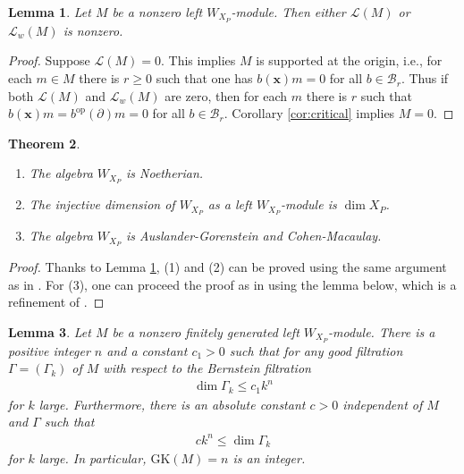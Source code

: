 \documentclass[11pt,a4paper,usenames,dvipsnames,reqno]{amsart}
\numberwithin{equation}{section}
\newtheorem{Thm}{Theorem}[section]
\newtheorem{Lem}[Thm]{Lemma}
\theoremstyle{definition}
\theoremstyle{remark}
\begin{document}
\begin{Lem}\label{lem:localization}
Let $M$ be a nonzero left $W_{X_P}$-module. Then either $\mathcal{L}(M)$ or $\mathcal{L}_w(M)$ is nonzero.
\end{Lem}

\begin{proof}
     Suppose $\mathcal{L}(M)=0$. This implies $M$ is supported at the origin, i.e., for each $m\in M$ there is $r\ge 0$ such that one has $b(\mathbf{x})m=0$ for all $b\in \mathcal{B}_r$. Thus if both $\mathcal{L}(M)$ and $\mathcal{L}_w(M)$ are zero, then for each $m$ there is $r$ such that $b(\mathbf{x})m=b^{\mathrm{op}}(\partial)m=0$
    for all $b\in \mathcal{B}_r$. Corollary \ref{cor:critical} implies $M=0$.
\end{proof}

\begin{Thm}\label{thm:properties}
\begin{enumerate}
    \item The algebra $W_{X_P}$ is Noetherian.
    \item The injective dimension of $W_{X_P}$ as a left $W_{X_P}$-module is $\dim X_P$.
    \item The algebra $W_{X_P}$ is Auslander-Gorenstein and Cohen-Macaulay.
\end{enumerate}  
\end{Thm}

\begin{proof}
    Thanks to Lemma \ref{lem:localization}, (1) and (2) can be proved using the same argument as in \cite[Theorem 1.1 and Theorem 1.2]{BBP:Gluingbasicaffine}. For (3), one can proceed the proof as in \cite[Theorem 3.3]{Stafford} using the lemma below, which is a refinement of \cite[Lemma 3.2]{Stafford}.
\end{proof}



\begin{Lem}\label{lem:multiplicity}
    Let $M$ be a nonzero finitely generated left $W_{X_P}$-module. There is a positive integer $n$ and a constant $c_1>0$ such that for any good filtration $\Gamma=(\Gamma_k)$ of $M$ with respect to the Bernstein filtration
    \begin{align*}
         \dim \Gamma_k\le c_1k^{n}
    \end{align*}
    for $k$ large. Furthermore, there is an absolute constant $c>0$ independent of $M$ and $\Gamma$ such that
    \begin{align*}
        ck^{n}\le \dim \Gamma_k
    \end{align*}
    for $k$ large. In particular, $\mathrm{GK}(M)=n$ is an integer.
\end{Lem}
\end{document}
